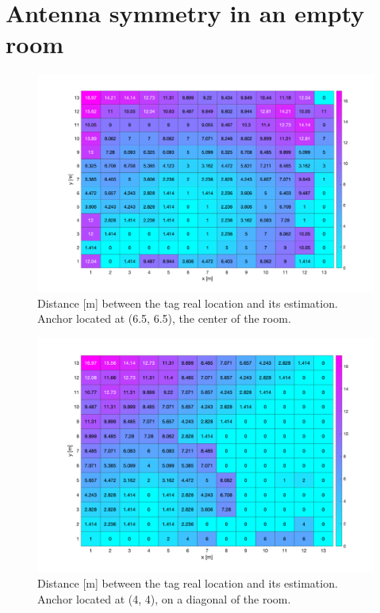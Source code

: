 \chapter{Antenna symmetry in an empty room}
\label{app:symmetry_antenna_placement}

\begin{figure}[H]
\centering
\includegraphics[width=\linewidth]{Images/65_65.png}
\caption{Distance [m] between the tag real location and its estimation. Anchor located at (6.5, 6.5), the center of the room.}
\end{figure}

\begin{figure}[H]
\centering
\includegraphics[width=.95\linewidth]{Images/4_4.png}
\caption{Distance [m] between the tag real location and its estimation. Anchor located at (4, 4), on a diagonal of the room.}
\end{figure}


